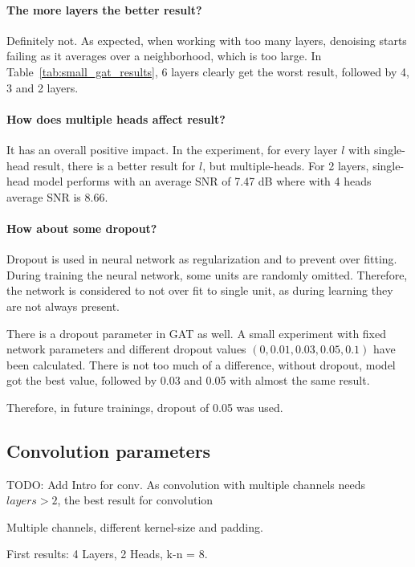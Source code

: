 \paragraph{The more layers the better result?}
Definitely not. As expected, when working with too many layers, denoising starts failing as it averages over a
neighborhood, which is too large. In Table~\ref{tab:small_gat_results}, 6 layers clearly get the worst result,
followed by 4, 3 and 2 layers.

\paragraph{How does multiple heads affect result?}
It has an overall positive impact. 
In the experiment, for every layer $l$ with single-head result, there
is a better result for $l$, but multiple-heads. 
For 2 layers, single-head model performs with an average SNR of 7.47 dB where with 4 heads average SNR is 8.66.

\paragraph{How about some dropout?}

Dropout is used in neural network as regularization and to prevent over fitting. 
During training the neural network, some units are randomly omitted. Therefore, the network is 
considered to not over fit to single unit, as during learning they are not always present.

There is a dropout parameter in GAT as well. A small experiment with fixed network parameters
and different dropout values $(0, 0.01, 0.03, 0.05, 0.1)$ have been calculated. 
There is not too much of a difference, without dropout, model got the best value, followed by 
0.03 and 0.05 with almost the same result. 

Therefore, in future trainings, dropout of 0.05 was used.


\subsection{Convolution parameters}

TODO: Add Intro for conv.
As convolution with multiple channels needs $layers > 2$, the best result for 
convolution 

Multiple channels, different kernel-size and padding.


First results:
4 Layers, 2 Heads, k-n = 8.

